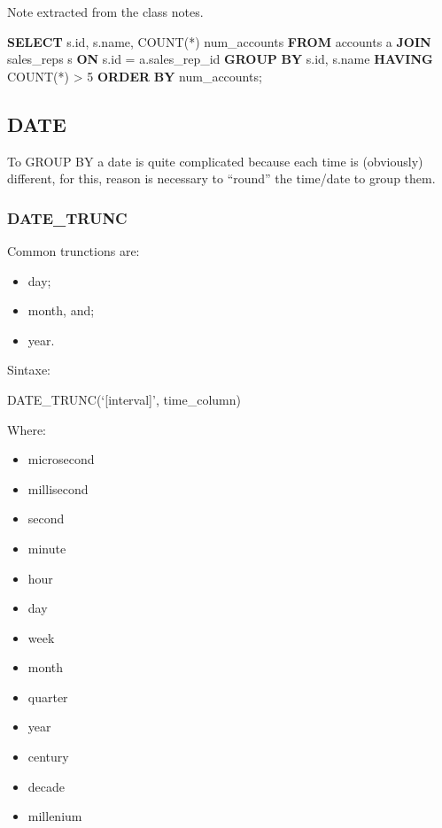 \documentclass[]{book}
\newenvironment{Shaded}{\begin{snugshade}}{\end{snugshade}}
\newcommand{\KeywordTok}[1]{\textcolor[rgb]{0.13,0.29,0.53}{\textbf{#1}}}
\newcommand{\DecValTok}[1]{\textcolor[rgb]{0.00,0.00,0.81}{#1}}
\newcommand{\FunctionTok}[1]{\textcolor[rgb]{0.00,0.00,0.00}{#1}}
\newcommand{\NormalTok}[1]{#1}
\providecommand{\tightlist}{%
  \setlength{\itemsep}{0pt}\setlength{\parskip}{0pt}}
\begin{document}
Note extracted from the class notes.

\begin{Shaded}
\begin{Highlighting}[]
\KeywordTok{SELECT}\NormalTok{ s.id, s.name, }\FunctionTok{COUNT}\NormalTok{(*) num_accounts}
\KeywordTok{FROM}\NormalTok{ accounts a}
\KeywordTok{JOIN}\NormalTok{ sales_reps s}
\KeywordTok{ON}\NormalTok{ s.id = a.sales_rep_id}
\KeywordTok{GROUP} \KeywordTok{BY}\NormalTok{ s.id, s.name}
\KeywordTok{HAVING} \FunctionTok{COUNT}\NormalTok{(*) > }\DecValTok{5}
\KeywordTok{ORDER} \KeywordTok{BY}\NormalTok{ num_accounts;}
\end{Highlighting}
\end{Shaded}

\subsection{DATE}\label{date}

To GROUP BY a date is quite complicated because each time is (obviously)
different, for this, reason is necessary to ``round'' the time/date to
group them.

\subsubsection{DATE\_TRUNC}\label{date_trunc}

Common trunctions are:

\begin{itemize}
\tightlist
\item
  day;
\item
  month, and;
\item
  year.
\end{itemize}

Sintaxe:

DATE\_TRUNC(`{[}interval{]}', time\_column)

Where:

\begin{itemize}
\tightlist
\item
  microsecond
\item
  millisecond
\item
  second
\item
  minute
\item
  hour
\item
  day
\item
  week
\item
  month
\item
  quarter
\item
  year
\item
  century
\item
  decade
\item
  millenium
\end{itemize}
\end{document}
